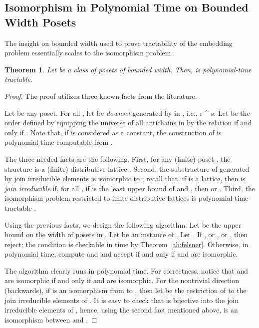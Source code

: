 \documentclass[usletter]{article}
\newcommand{\longversion}[1]{#1}
\newcommand{\shortversion}[1]{}
\newcommand{\longshort}[2]{\longversion{#1}\shortversion{#2}}
\newtheorem{theorem}{Theorem}
\begin{document}
{\longversion{\pfdegreenphard}

\longshort{\subsection{Isomorphism in Polynomial Time on Bounded Width Posets}\label{sect:wdtract}}{\subsection{Isomorphism in Polytime on Bounded Width Posets}\label{sect:wdtract}}

The insight on bounded width used to prove tractability of the embedding problem 
essentially scales to the isomorphism problem.

\begin{theorem}\label{th:isoptime}
Let  be a class of posets of bounded width.  Then, 
 is polynomial-time tractable.
\end{theorem}
\begin{proof}
The proof utilizes three known facts from the literature.  

Let  be any poset.  
For all , let 
 be \emph{downset} generated by  in  , i.e., 
 r \leq^{} s.  
Let  be the order defined 
by equipping the universe of all antichains in  
by the relation  if and only if 
.  Note that, if  
is considered as a constant, the construction of  
is polynomial-time computable from . 

The three needed facts are the following.  First, for any (finite) poset , 
the structure  is a (finite) distributive lattice \cite[Proposition~5.5.5]{Schroder03}.  
Second, the substructure of  
generated by join irreducible elements is isomorphic to  \cite[Theorem~5.5.6]{Schroder03}; 
recall that, if  is a lattice, 
then  is \emph{join irreducible} if, for all , 
if  is the least upper bound of  and , then  or .   
Third, the isomorphism problem restricted to finite distributive lattices 
is polynomial-time tractable \cite{GorazdIdziak95}.  

Using the previous facts, we design the following algorithm.
Let  be the upper bound on the width of posets in .  
Let  be an instance of .  Let .  
If , or , 
or , then reject; 
the condition is checkable in time  by Theorem~\ref{th:felsner}.  
Otherwise, in polynomial time, 
compute  and  
and accept if and only if  and  are isomorphic.  

The algorithm clearly runs in polynomial time.  For correctness, 
notice that  and  are isomorphic if and only if 
 and  are isomorphic.  For the nontrivial direction (backwards), 
if  is an isomorphism from  to , 
then let  be the restriction of  to the join irreducible elements 
of .  It is easy to check that  is bijective into 
the join irreducible elements of , hence, 
using the second fact mentioned above, 
 is an isomorphism between  and .
\end{proof}





}
\end{document}
